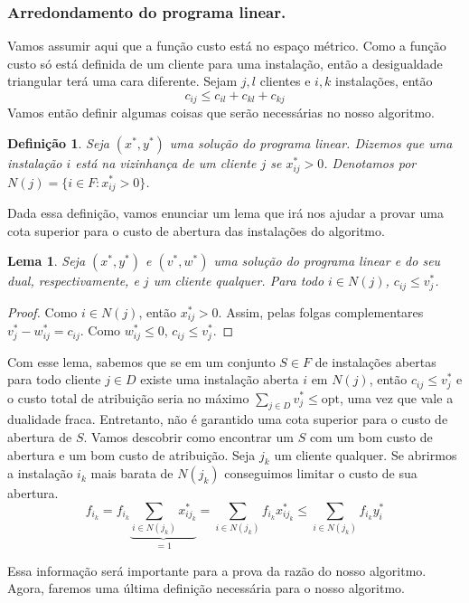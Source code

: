 \documentclass[12pt]{article}
\newcommand{\opt}{\ensuremath{\mathrm{opt}}}
\newtheorem{lemma}[theorem]{Lema}
\newtheorem{definition}[theorem]{Definição}
\begin{document}
\subsubsection{Arredondamento do programa linear.}
Vamos assumir aqui que a função custo está no espaço métrico. Como a função custo só está definida de um cliente para uma instalação, então a desigualdade triangular terá uma cara diferente. Sejam $j,l$ clientes e $i,k$ instalações, então
\[c_{ij} \leq c_{il} + c_{kl} + c_{kj}\]
Vamos então definir algumas coisas que serão necessárias no nosso algoritmo.
\begin{definition}
    Seja $(x^*,y^*)$ uma solução do programa linear. Dizemos que uma instalação $i$ está na \emph{vizinhança} de um cliente $j$ se $x^*_{ij} > 0$. Denotamos por $N(j) = \{ i \in F : x^*_{ij} > 0\}$.
\end{definition}
Dada essa definição, vamos enunciar um lema que irá nos ajudar a provar uma cota superior para o custo de abertura das instalações do algoritmo.
\begin{lemma}\label{lemma:3.5}
    Seja $(x^*,y^*)$ e $(v^*,w^*)$ uma solução do programa linear e do seu dual, respectivamente, e $j$ um cliente qualquer. Para todo $i \in N(j)$, $c_{ij} \leq v^*_j$.
\end{lemma}
\begin{proof}
    Como $i \in N(j)$, então $x^*_{ij}>0$. Assim, pelas folgas complementares $v^*_j - w^*_{ij} = c_{ij}$. Como $w^*_{ij} \leq 0$, $c_{ij} \leq v^*_j$. 
\end{proof}
Com esse lema, sabemos que se em um conjunto $S \in F$ de instalações abertas para todo cliente $j \in D$ existe uma instalação aberta $i$ em $N(j)$, então $c_{ij}\leq v_j^*$ e o custo total de atribuição seria no máximo $\sum_{j\in D}v_j^* \leq \opt$, uma vez que vale a dualidade fraca. Entretanto, não é garantido uma cota superior para o custo de abertura de $S$. Vamos descobrir como encontrar um $S$ com um bom custo de abertura e um bom custo de atribuição. Seja $j_k$ um cliente qualquer. Se abrirmos a instalação $i_k$ mais barata de $N(j_k)$ conseguimos limitar o custo de sua abertura.
\[
    f_{i_k} = f_{i_k} \underbrace{\sum_{i \in N(j_k)}x^*_{ij_k}}_{=1} = \sum_{i \in N(j_k)}f_{i_k}x^*_{ij_k} \leq \sum_{i \in N(j_k)}f_{i_k}y^*_{i}
\]

Essa informação será importante para a prova da razão do nosso algoritmo. Agora, faremos uma última definição necessária para o nosso algoritmo.
\end{document}
